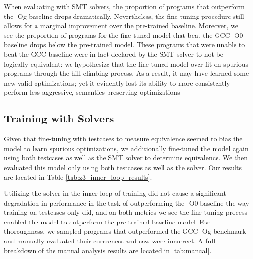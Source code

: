 \documentclass{article}
\begin{document}


When evaluating with SMT solvers, the proportion of programs that outperform the -Og baseline drops dramatically. Nevertheless, the fine-tuning procedure still allows for a marginal improvement over the pre-trained baseline. Moreover, we see the proportion of programs for the fine-tuned model that beat the GCC -O0 baseline drops below the pre-trained model. These programs that were unable to beat the GCC baseline were in-fact declared by the SMT solver to not be logically equivalent: we hypothesize that the fine-tuned model over-fit on spurious programs through the hill-climbing process. As a result, it may have learned some new valid optimizations; yet it evidently lost its ability to more-consistently perform less-aggressive, semantics-preserving optimizations. 

\subsection{Training with Solvers}

Given that fine-tuning with testcases to measure equivalence seemed to bias the model to learn spurious optimizations, we additionally fine-tuned the model again using both testcases as well as the SMT solver to determine equivalence. We then evaluated this model only using both testcases as well as the solver. Our results are located in Table \ref{tab:z3_inner_loop_results}. 

Utilizing the solver in the inner-loop of training did not cause a significant degradation in performance in the task of outperforming the -O0 baseline the way training on testcases only did, and on both metrics we see the fine-tuning process enabled the model to outperform the pre-trained baseline model. For thoroughness, we sampled  programs that outperformed the GCC -Og benchmark and manually evaluated their correcness and saw  were incorrect. A full breakdown of the manual analysis results are located in \ref{tab:manual}.
\end{document}
